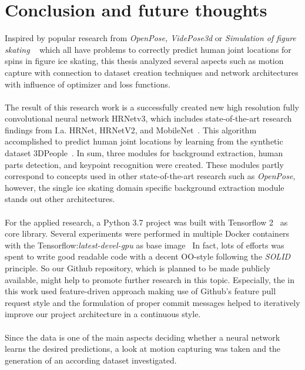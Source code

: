 \chapter{Conclusion and future thoughts}
\label{conclusion}
Inspired by popular research from \textit{OpenPose, VidePose3d} or \textit{Simulation of figure skating} ~\cite{openpose, videopose3d, figureskatingsimulation}
which all have problems to correctly predict human joint locations for spins in figure ice skating, this thesis analyzed
several aspects such as motion capture with connection to dataset creation techniques and network architectures with influence of optimizer and loss functions.
\\\mbox{}\\
The result of this research work is a successfully created new high resolution fully convolutional neural network HRNetv3, which includes state-of-the-art
research findings from I.a. HRNet, HRNetV2, and MobileNet~\cite{HRNetv1, HRNetv2, mobilenet}.
This algorithm accomplished to predict human joint locations by learning from the synthetic dataset 3DPeople~\cite{3dpeople}.
In sum, three modules for background extraction, human parts detection, and keypoint recognition were created.
These modules partly correspond to concepts used in other state-of-the-art research such as \textit{OpenPose}, however, the
single ice skating domain specific background extraction module stands out other architectures.
\\\mbox{}\\
For the applied research, a Python 3.7 project  was built with Tensorflow 2~\cite{tensorflow2} as core library.
Several experiments were performed in multiple Docker containers with the Tensorflow:\textit{latest-devel-gpu} as base
image~\cite{tensorflowdocker}
In fact, lots of efforts was spent to write good readable code with a decent OO-style following the \textit{SOLID} principle.
So our Github repository, which is planned to be made publicly available, might help to promote further research in this topic.
Especially, the in this work used feature-driven approach making use of Github's feature pull request style and the formulation of proper
commit messages helped to iteratively improve our project architecture in a continuous style.
\\\mbox{}\\
Since the data is one of the main aspects deciding whether a neural network learns the desired predictions, a look at
motion capturing was taken and the generation of an according dataset investigated.

